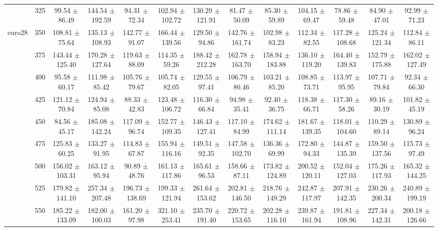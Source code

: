 \begin{table}[h]
{\begin{tabular}{
        ccccccccccccc}
 & 325& 99.54 $\pm$ 86.49& 144.54 $\pm$ 192.59& 94.31 $\pm$ 72.34& 102.94 $\pm$ 102.72& 130.29 $\pm$ 121.91& 81.47 $\pm$ 50.09& 85.30 $\pm$ 59.89& 104.15 $\pm$ 69.47& 78.86 $\pm$ 59.48& 84.90 $\pm$ 47.01& 92.99 $\pm$ 71.23 \\ 
\multirow{4}{*}{euro28}& 350& 108.81 $\pm$ 75.64& 135.13 $\pm$ 108.93& 142.77 $\pm$ 91.07& 166.44 $\pm$ 139.56& 129.50 $\pm$ 94.86& 142.76 $\pm$ 161.74& 102.98 $\pm$ 83.23& 112.34 $\pm$ 82.55& 117.28 $\pm$ 108.68& 125.24 $\pm$ 121.34& 112.84 $\pm$ 86.11 \\ 
 & 375& 143.44 $\pm$ 125.40& 170.28 $\pm$ 127.64& 119.63 $\pm$ 88.09& 114.35 $\pm$ 59.26& 188.42 $\pm$ 212.28& 162.78 $\pm$ 163.70& 158.94 $\pm$ 183.88& 136.10 $\pm$ 119.20& 164.40 $\pm$ 139.83& 152.79 $\pm$ 175.88& 162.02 $\pm$ 127.49 \\ 
 & 400& 95.58 $\pm$ 60.17& 111.98 $\pm$ 85.42& 105.76 $\pm$ 79.67& 105.74 $\pm$ 82.05& 129.55 $\pm$ 97.41& 106.79 $\pm$ 80.46& 103.21 $\pm$ 85.20& 108.85 $\pm$ 73.71& 113.97 $\pm$ 95.95& 107.71 $\pm$ 79.84& 92.34 $\pm$ 66.30 \\ 
 & 425& 121.12 $\pm$ 70.84& 124.94 $\pm$ 85.08& 88.33 $\pm$ 42.83& 123.48 $\pm$ 106.72& 116.30 $\pm$ 66.84& 94.98 $\pm$ 35.41& 92.40 $\pm$ 36.75& 118.38 $\pm$ 66.71& 117.30 $\pm$ 58.26& 89.16 $\pm$ 30.19& 101.82 $\pm$ 45.19 \\ 
 & 450& 84.56 $\pm$ 45.17& 185.08 $\pm$ 142.24& 117.09 $\pm$ 96.74& 152.77 $\pm$ 109.35& 146.43 $\pm$ 127.41& 117.10 $\pm$ 84.99& 174.62 $\pm$ 111.14& 181.67 $\pm$ 139.35& 118.01 $\pm$ 104.60& 110.29 $\pm$ 89.14& 130.89 $\pm$ 96.24 \\ 
 & 475& 125.83 $\pm$ 60.25& 133.27 $\pm$ 91.95& 114.83 $\pm$ 67.87& 155.94 $\pm$ 116.16& 149.51 $\pm$ 92.35& 147.58 $\pm$ 102.70& 136.36 $\pm$ 69.99& 172.80 $\pm$ 94.33& 144.87 $\pm$ 135.39& 159.50 $\pm$ 137.56& 115.73 $\pm$ 97.49 \\ 
 & 500& 156.02 $\pm$ 103.31& 163.12 $\pm$ 95.94& 90.89 $\pm$ 48.76& 161.13 $\pm$ 117.86& 165.61 $\pm$ 96.53& 158.66 $\pm$ 87.11& 173.82 $\pm$ 124.89& 200.52 $\pm$ 120.11& 152.04 $\pm$ 127.03& 175.26 $\pm$ 117.93& 165.32 $\pm$ 144.25 \\ 
 & 525& 179.82 $\pm$ 141.10& 257.34 $\pm$ 207.48& 196.73 $\pm$ 138.69& 199.33 $\pm$ 121.94& 261.64 $\pm$ 153.62& 202.81 $\pm$ 146.50& 218.76 $\pm$ 149.29& 242.87 $\pm$ 117.97& 207.91 $\pm$ 142.35& 230.26 $\pm$ 200.34& 240.89 $\pm$ 199.19 \\ 
 & 550& 185.22 $\pm$ 133.09& 182.00 $\pm$ 100.03& 161.20 $\pm$ 97.98& 321.10 $\pm$ 253.41& 235.70 $\pm$ 191.40& 220.72 $\pm$ 153.65& 202.28 $\pm$ 116.10& 239.87 $\pm$ 161.94& 191.81 $\pm$ 108.96& 227.34 $\pm$ 142.31& 200.18 $\pm$ 126.66 \\ 

\end{tabular}}
\end{table}
